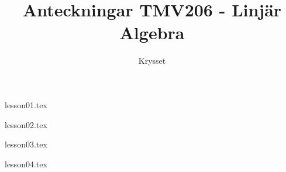 \documentclass[a4paper]{report}
\title{Anteckningar TMV206 - Linjär Algebra}
\author{Krysset}
\begin{document}
    \maketitle
    \tableofcontents


    {lesson01.tex}

    {lesson02.tex}

    {lesson03.tex}

    {lesson04.tex}
\end{document}
